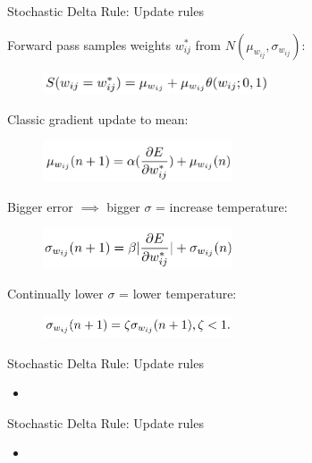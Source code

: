 \documentclass{beamer}
\begin{document}
\begin{frame}{Stochastic Delta Rule: Update rules}

Forward pass samples weights $w^{*}_{ij}$ from $N(\mu_{w_{ij}},\sigma_{w_{ij}})$:
\begin{figure}[h]
\includegraphics[width=0.6\textwidth]{img/init}
\end{figure}

Classic gradient update to mean:
\begin{figure}[h]
\includegraphics[width=0.5\textwidth]{img/update_mu}
\end{figure}

Bigger error $\implies$ bigger $\sigma$ = increase temperature:
\begin{figure}[h]
\includegraphics[width=0.5\textwidth]{img/update_sigma}
\end{figure}

Continually lower $\sigma$ = lower temperature:
\begin{figure}[h]
\includegraphics[width=0.5\textwidth]{img/update_sigma_2}
\end{figure}



\end{frame}
\begin{frame}{Stochastic Delta Rule: Update rules}

\begin{itemize}
\item 
\end{itemize}

\end{frame}
\begin{frame}{Stochastic Delta Rule: Update rules}

\begin{itemize}
\item 
\end{itemize}

\end{frame}
\end{document}
